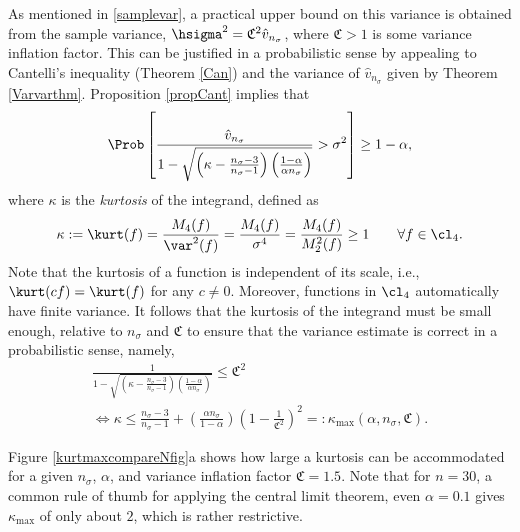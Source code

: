 \documentclass[graybox]{svmult}
\newcommand{\hv}{\hat{v}}
\newcommand{\fudge}{\mathfrak{C}}
\begin{document}
As mentioned in \eqref{samplevar}, a practical upper bound on this variance is obtained from the sample variance, $\hsigma^2 = \fudge^2 \hv_{n_{\sigma}}$, where $\fudge > 1$ is some variance inflation factor. This can be justified in a probabilistic sense by appealing to  Cantelli's inequality (Theorem \ref{Can}) and the variance of $\hv_{n_{\sigma}}$ given by Theorem \ref{Varvarthm}.  Proposition \ref{propCant} implies that
\[
\Prob \left[\frac{\hv_{n_{\sigma}}}{1 - \sqrt{\left ( \kappa  - \frac{n_{\sigma}-3}{n_{\sigma}-1}\right)\left(\frac{1-\alpha}{\alpha n_{\sigma}}\right)}} > \sigma^2 \right] \ge 1 - \alpha,
\]
where $\kappa$ is the \emph{kurtosis} of the integrand, defined as
\begin{equation} \label{kurtdef}
\kappa:= \kurt(f) = \frac{M_4(f)}{\var^2(f)} = \frac{M_4(f)}{\sigma^4} = \frac{M_4(f)}{M_2^2(f)} \ge 1 \qquad \forall f \in \cl_4.
\end{equation}
Note that the kurtosis of a function is independent of its scale, i.e., $\kurt(cf)=\kurt(f)$ for any $c \ne 0$.  Moreover, functions in $\cl_4$ automatically have finite variance.  It follows that the kurtosis of the integrand must be small enough, relative to $n_{\sigma}$ and $\fudge$ to ensure that the variance estimate is correct in a probabilistic sense, namely, 
\begin{multline}
\frac{1}{1 - \sqrt{\left ( \kappa  - \frac{n_{\sigma}-3}{n_{\sigma}-1}\right)\left(\frac{1-\alpha}{\alpha n_{\sigma}}\right)}} \le \fudge^2
\\
\iff \kappa \le \frac{n_{\sigma}-3}{n_{\sigma}-1} + \left(\frac{ \alpha n_{\sigma}}{1-\alpha}\right) \left(1 - \frac{1}{\fudge^2}\right)^2 =: \kappa_{\max} (\alpha,n_{\sigma},\fudge). \label{kappamaxdef}
\end{multline}

Figure \ref{kurtmaxcompareNfig}a shows how large a kurtosis can be accommodated for a given $n_{\sigma}$, $\alpha$, and variance inflation factor $\fudge=1.5$.  Note that for $n=30$, a common rule of thumb for applying the central limit theorem, even $\alpha=0.1$ gives $\kappa_{\max}$ of only about $2$, which is rather restrictive.
\end{document}
